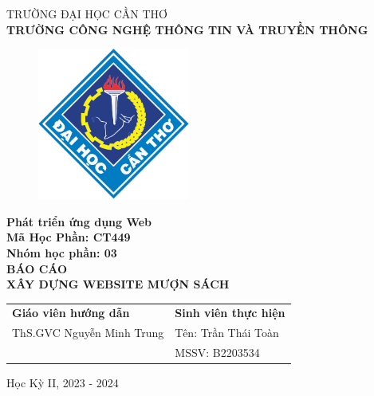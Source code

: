 \begin{titlepage}
  \begin{center}
    \vspace{-6pt}TRƯỜNG ĐẠI HỌC CẦN THƠ \\
    \textbf{\fontsize{16pt}{0pt}\selectfont TRƯỜNG CÔNG NGHỆ THÔNG TIN VÀ TRUYỀN THÔNG}
    \begin{figure}[H]
      \centering
      \includegraphics[width=5cm]{images/logo-ctu.png}
    \end{figure}
    \textbf{Phát triển ứng dụng Web} \\
    \textbf{Mã Học Phần: CT449} \\
    \textbf{Nhóm học phần: 03} \\
    \vspace{3.5cm}
    \textbf{\fontsize{16pt}{0pt}\selectfont BÁO CÁO} \\
    \textbf{\fontsize{18pt}{0pt}\selectfont XÂY DỰNG WEBSITE MƯỢN SÁCH} \\
    \vspace{4.5cm}
    \newcommand{\MyIndent}{\hspace{1cm}}
    \begin{tabular}{p{8cm} l}
      \textbf{Giáo viên hướng dẫn}        & \textbf{Sinh viên thực hiện}  \\
      \MyIndent ThS.GVC Nguyễn Minh Trung & \MyIndent Tên: Trần Thái Toàn \\
                                          & \MyIndent MSSV: B2203534
    \end{tabular}


    \vspace{2cm}
    \fontsize{14pt}{0pt}\selectfont Học Kỳ II, 2023 - 2024
  \end{center}
\end{titlepage}
\cleardoublepage
